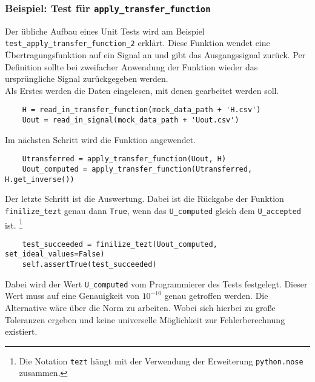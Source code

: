 \documentclass[../Report.tex]{subfiles}
\begin{document}
\subsubsection{Beispiel: Test für \lstinline{apply_transfer_function}}
\label{subsubsec.code.tdd.example}
Der übliche Aufbau eines Unit Tests wird am Beispiel \lstinline{test_apply_transfer_function_2} erklärt. Diese Funktion wendet eine Übertragungsfunktion auf ein Signal an und gibt das Ausgangssignal zurück. Per Definition sollte bei zweifacher Anwendung der Funktion wieder das ursprüngliche Signal zurückgegeben werden.\\
Als Erstes werden die Daten eingelesen, mit denen gearbeitet werden soll.
\lstset{language=Python}
\begin{lstlisting}
	H = read_in_transfer_function(mock_data_path + 'H.csv')
	Uout = read_in_signal(mock_data_path + 'Uout.csv')	
\end{lstlisting}
Im nächsten Schritt wird die Funktion angewendet.
\lstset{language=Python}
\begin{lstlisting}
	Utransferred = apply_transfer_function(Uout, H)
	Uout_computed = apply_transfer_function(Utransferred, H.get_inverse())	
\end{lstlisting}
Der letzte Schritt ist die Auswertung. Dabei ist die Rückgabe der Funktion \lstinline{finilize_tezt} genau dann \lstinline{True}, wenn das \lstinline{U_computed} gleich dem \lstinline{U_accepted} ist.
\footnote{Die Notation \lstinline{tezt} hängt mit der Verwendung der Erweiterung \lstinline{python.nose} zusammen.}
\lstset{language=Python}
\begin{lstlisting}
	test_succeeded = finilize_tezt(Uout_computed, set_ideal_values=False)
	self.assertTrue(test_succeeded)
\end{lstlisting}
Dabei wird der Wert \lstinline{U_computed} vom Programmierer des Tests festgelegt. Dieser Wert muss auf eine Genauigkeit von $10^{-10}$ genau getroffen werden. Die Alternative wäre über die Norm zu arbeiten. Wobei sich hierbei zu große Toleranzen ergeben und keine universelle Möglichkeit zur Fehlerberechnung existiert.
\end{document}
